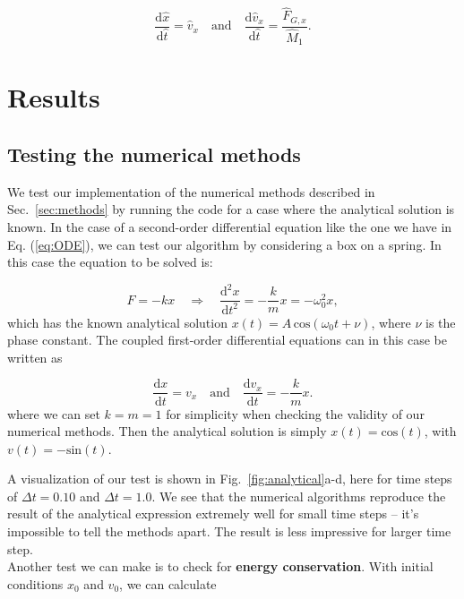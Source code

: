 \documentclass{article}
\begin{document}
\begin{multicols}{2}
\begin{equation}
	\frac{\mathrm{d}\hat{x}}{\mathrm{d} \hat{t}} = \hat{v}_x  \quad \mathrm{and} \quad \frac{\mathrm{d}\hat{v}_x}{\mathrm{d}\hat{t}} = \frac{\hat{F}_{G,x}}{\hat{M}_1}.
\end{equation}


\section{Results}

\subsection{Testing the numerical methods}\label{sec:analytical_test}

We test our implementation of the numerical methods described in Sec.~\ref{sec:methods} by running the code for a case where the analytical solution is known. In the case of a second-order differential equation like the one we have in Eq. (\ref{eq:ODE}), we can test our algorithm by considering a box on a spring. In this case the equation to be solved is:

\begin{equation}
	F = -kx \quad \Rightarrow \quad \frac{\mathrm{d}^2 x}{\mathrm{d}t^2} = - \frac{k}{m}x = - \omega_0^2 x,
\end{equation}
which has the known analytical solution $x(t) = A \, \mathrm{cos}(\omega_0 t + \nu)$, where $\nu$ is the phase constant. The coupled first-order differential equations can in this case be written as

\begin{equation}
	\frac{\mathrm{d}x}{\mathrm{d}t} = v_x  \quad \mathrm{and} \quad \frac{\mathrm{d}v_x}{\mathrm{d}t} = - \frac{k}{m} x.
\end{equation}
where we can set $k = m = 1$ for simplicity when checking the validity of our numerical methods. Then the analytical solution is simply $x(t) = \mathrm{cos}(t)$, with $v(t) = - \mathrm{sin}(t)$.

A visualization of our test is shown in Fig.~\ref{fig:analytical}a-d, here for time steps of $\Delta t = 0.10$ and $\Delta t = 1.0$. We see that the numerical algorithms reproduce the result of the analytical expression extremely well for small time steps -- it's impossible to tell the methods apart. The result is less impressive for larger time step.\\

\noindent Another test we can make is to check for \textbf{energy conservation}. With initial conditions $x_0$ and $v_0$, we can calculate


\end{multicols}
\end{document}
